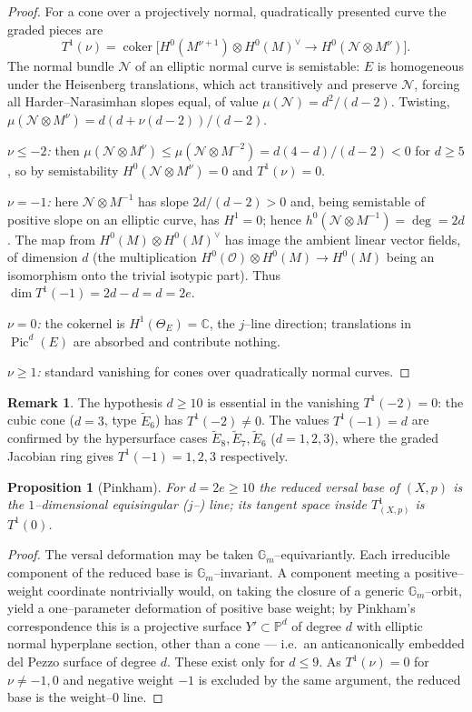 \documentclass[11pt]{amsart}
\newtheorem{proposition}{Proposition}
\theoremstyle{definition}
\newtheorem{remark}{Remark}
\DeclareMathOperator{\coker}{coker}
\DeclareMathOperator{\Pic}{Pic}
\newcommand{\cO}{\mathcal{O}}
\newcommand{\cN}{\mathcal{N}}
\newcommand{\PP}{\mathbb{P}}
\newcommand{\CC}{\mathbb{C}}
\newcommand{\Gm}{\mathbb{G}_m}
\begin{document}
\begin{proof}
For a cone over a projectively normal, quadratically presented curve the graded
pieces are
\[
T^1(\nu)=\coker\!\Big[H^0(M^{\nu+1})\otimes H^0(M)^\vee \to H^0(\cN\otimes M^{\nu})\Big].
\]
The normal bundle $\cN$ of an elliptic normal curve is semistable: $E$ is
homogeneous under the Heisenberg translations, which act transitively and
preserve $\cN$, forcing all Harder--Narasimhan slopes equal, of value
$\mu(\cN)=d^2/(d-2)$. Twisting, $\mu(\cN\otimes M^{\nu})=d(d+\nu(d-2))/(d-2)$.

\emph{$\nu\le-2$:} then $\mu(\cN\otimes M^\nu)\le \mu(\cN\otimes M^{-2})=d(4-d)/(d-2)<0$
for $d\ge5$, so by semistability $H^0(\cN\otimes M^\nu)=0$ and $T^1(\nu)=0$.

\emph{$\nu=-1$:} here $\cN\otimes M^{-1}$ has slope $2d/(d-2)>0$ and, being
semistable of positive slope on an elliptic curve, has $H^1=0$; hence
$h^0(\cN\otimes M^{-1})=\deg=2d$. The map from
$H^0(M)\otimes H^0(M)^\vee$ has image the ambient linear vector fields, of
dimension $d$ (the multiplication $H^0(\cO)\otimes H^0(M)\to H^0(M)$ being an
isomorphism onto the trivial isotypic part). Thus $\dim T^1(-1)=2d-d=d=2e$.

\emph{$\nu=0$:} the cokernel is $H^1(\Theta_E)=\CC$, the $j$--line direction;
translations in $\Pic^d(E)$ are absorbed and contribute nothing.

\emph{$\nu\ge1$:} standard vanishing for cones over quadratically normal curves.
\end{proof}

\begin{remark}
The hypothesis $d\ge10$ is essential in the vanishing $T^1(-2)=0$: the cubic cone
($d=3$, type $\widetilde E_6$) has $T^1(-2)\ne0$. The values
$T^1(-1)=d$ are confirmed by the hypersurface cases $\widetilde E_8,\widetilde
E_7,\widetilde E_6$ ($d=1,2,3$), where the graded Jacobian ring gives
$T^1(-1)=1,2,3$ respectively.
\end{remark}

\begin{proposition}[Pinkham]\label{prop:pinkham}
For $d=2e\ge10$ the reduced versal base of $(X,p)$ is the $1$--dimensional
equisingular ($j$--) line; its tangent space inside $T^1_{(X,p)}$ is $T^1(0)$.
\end{proposition}

\begin{proof}
The versal deformation may be taken $\Gm$--equivariantly. Each irreducible
component of the reduced base is $\Gm$--invariant. A component meeting a
positive--weight coordinate nontrivially would, on taking the closure of a
generic $\Gm$--orbit, yield a one--parameter deformation of positive base weight;
by Pinkham's correspondence this is a projective surface $Y'\subset\PP^{d}$ of
degree $d$ with elliptic normal hyperplane section, other than a cone --- i.e.\
an anticanonically embedded del Pezzo surface of degree $d$. These exist only
for $d\le9$. As $T^1(\nu)=0$ for $\nu\ne-1,0$ and negative weight $-1$ is
excluded by the same argument, the reduced base is the weight--$0$ line.
\end{proof}
\end{document}
